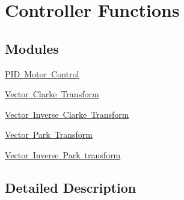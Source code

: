 \hypertarget{group__group_controller}{}\section{Controller Functions}
\label{group__group_controller}
\subsection*{Modules}
\begin{DoxyCompactItemize}
\item 
\mbox{\hyperlink{group___p_i_d}{P\+I\+D Motor Control}}
\item 
\mbox{\hyperlink{group__clarke}{Vector Clarke Transform}}
\item 
\mbox{\hyperlink{group__inv__clarke}{Vector Inverse Clarke Transform}}
\item 
\mbox{\hyperlink{group__park}{Vector Park Transform}}
\item 
\mbox{\hyperlink{group__inv__park}{Vector Inverse Park transform}}
\end{DoxyCompactItemize}


\subsection{Detailed Description}
